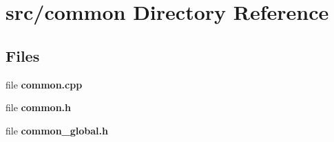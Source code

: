 \section{src/common Directory Reference}
\label{dir_fdedb0aba14d44ce9d99bc100e026e6a}
\subsection*{Files}
\begin{DoxyCompactItemize}
\item 
file \textbf{ common.\+cpp}
\item 
file \textbf{ common.\+h}
\item 
file \textbf{ common\+\_\+global.\+h}
\end{DoxyCompactItemize}

